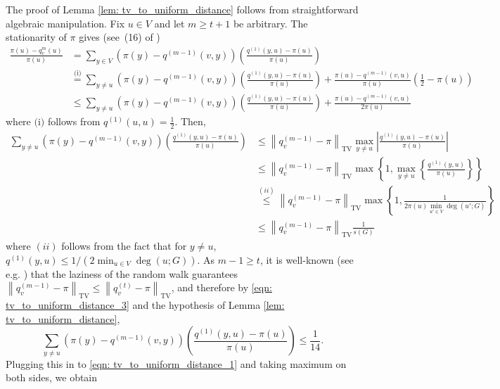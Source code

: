 \documentclass[11pt,twoside]{article}
\newcommand{\set}[1]{\left\{#1\right\}}
\newcommand{\abs}[1]{\left \lvert #1 \right \rvert}
\newcommand{\norm}[1]{\left\lVert#1\right\rVert}
\newcommand{\1}{\mathbbm{1}}
\begin{document}
The proof of Lemma \ref{lem: tv_to_uniform_distance} follows from straightforward algebraic manipulation. Fix $u \in V$ and let $m \geq t + 1$ be arbitrary. The stationarity of $\pi$ gives (see~(16) of \citep{morris2005})
\begin{align}
\frac{\pi(u) - q_v^{m}(u)}{\pi(u)} & = \sum_{y \in V} \left(\pi(y) - q^{(m-1)}(v,y)\right) \left(\frac{q^{(1)}(y,u) - \pi(u)}{\pi(u)}\right) \nonumber \\
& \overset{\text{(i)}}{=} \sum_{y \neq u} \left(\pi(y) - q^{(m-1)}(v,y)\right) \left(\frac{q^{(1)}(y,u) - \pi(u)}{\pi(u)}\right) + \frac{\pi(u) - q^{(m - 1)}(v,u)}{\pi(u)} \left(\frac{1}{2} - \pi(u)\right) \nonumber \\
& \leq \sum_{y \neq u} \left(\pi(y) - q^{(m-1)}(v,y)\right) \left(\frac{q^{(1)}(y,u) - \pi(u)}{\pi(u)}\right) + \frac{\pi(u) - q^{(m - 1)}(v,u)}{2 \pi(u)} \label{eqn: tv_to_uniform_distance_1}
\end{align}
where $\text{(i)}$ follows from $q^{(1)}(u,u) = \frac{1}{2}$. Then,
\begin{align}
\sum_{y \neq u} \left(\pi(y) - q^{(m-1)}(v,y)\right) \left(\frac{q^{(1)}(y,u) - \pi(u)}{\pi(u)}\right) & \leq \norm{q_v^{(m-1)} - \pi}_{\mathrm{TV}} \max_{y \neq u} \abs{\frac{q^{(1)}(y,u) - \pi(u)}{\pi(u)}} \nonumber \\
& \leq \norm{q_v^{(m-1)} - \pi}_{\mathrm{TV}} \max \set{1, \max_{y \neq u}\set{\frac{q^{(1)}(y,u)}{\pi(u)}}} \nonumber \\
& \overset{(ii)}{\leq} \norm{q_v^{(m-1)} - \pi}_{\mathrm{TV}} \max \set{1, \frac{1}{2 \pi(u) \min_{u' \in V} \deg(u';G) }} \nonumber \\
& \leq \norm{q_v^{(m-1)} - \pi}_{\mathrm{TV}} \frac{1}{s(G)} \label{eqn: tv_to_uniform_distance_3}
\end{align}
where $(ii)$ follows from the fact that for $y \neq u$, $q^{(1)}(y,u) \leq 1/\left(2 \min_{u \in V} \deg(u; G)\right)$. As $m - 1 \geq t$, it is well-known (see e.g. \cite{lovasz1990}) that the laziness of the random walk guarantees $\norm{q_v^{(m - 1)} - \pi}_{\mathrm{TV}} \leq \norm{q_v^{(t)} - \pi}_{\mathrm{TV}}$, and therefore by \eqref{eqn: tv_to_uniform_distance_3} and the hypothesis of Lemma \ref{lem: tv_to_uniform_distance},
\begin{equation*}
\sum_{y \neq u} \left(\pi(y) - q^{(m-1)}(v,y)\right) \left(\frac{q^{(1)}(y,u) - \pi(u)}{\pi(u)}\right) \leq \frac{1}{14}.
\end{equation*}
Plugging this in to \eqref{eqn: tv_to_uniform_distance_1} and taking maximum on both sides, we obtain
\end{document}
